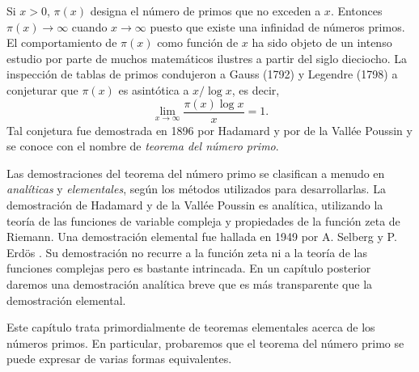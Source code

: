 \documentclass[12pt,a4paper]{book}
\begin{document}
    Si $x>0$, $\pi(x)$ designa el número de primos que no exceden a $x$. Entonces\label{sim:pi}
    $\pi(x)\to\infty$ cuando $x\to\infty$ puesto que existe una infinidad de números
    primos. El comportamiento de $\pi(x)$ como función de $x$ ha sido objeto de un
    intenso estudio por parte de muchos matemáticos ilustres a partir del siglo
    dieciocho. La inspección de tablas de primos condujeron a Gauss (1792) \cite{gauss1849} y Legendre
    (1798) \cite{legendre1798} a conjeturar que $\pi(x)$ es asintótica a $x/\log x$, es decir,
    \begin{equation*}
        \lim_{x\to\infty}\frac{\pi(x)\log x}{x}=1.
    \end{equation*}
    Tal conjetura fue demostrada en 1896 por Hadamard \cite{hadamard1896} y por de la Vallée Poussin \cite{valleepoussin1896} y se
    conoce con el nombre de \textit{teorema del número primo}.

    Las demostraciones del teorema del número primo se clasifican a menudo en
    \textit{analíticas} y \textit{elementales}, según los métodos utilizados para
    desarrollarlas. La demostración de Hadamard y de la Vallée Poussin es analítica,
    utilizando la teoría de las funciones de variable compleja y propiedades de la
    función zeta de Riemann. Una demostración elemental fue hallada en 1949 por
    A. Selberg \cite{selberg1949} y P. Erdös \cite{erdos1949}. Su demostración no recurre a la función zeta ni a la teoría
    de las funciones complejas pero es bastante intrincada. En un capítulo posterior
    daremos una demostración analítica breve que es más transparente que la
    demostración elemental.

    Este capítulo trata primordialmente de teoremas elementales acerca de los números
    primos. En particular, probaremos que el teorema del número primo se puede
    expresar de varias formas equivalentes.
\end{document}
